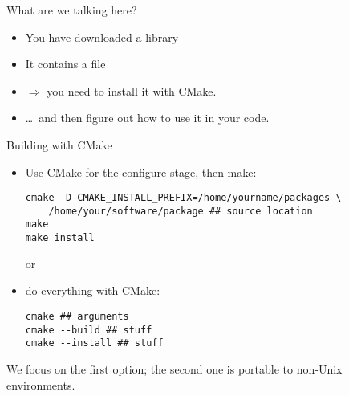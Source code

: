 
\lstset{language=bash}


\begin{numberedframe}{What are we talking here?}
  \begin{itemize}
  \item You have downloaded a library
  \item It contains a file 
  \item $\Rightarrow$ you need to install it with CMake.
  \item \ldots~and then figure out how to use it in your code.
  \end{itemize}
\end{numberedframe}

\begin{comment}
\begin{numberedframe}{Building software the old way}
  Using `GNU Autotools':
\begin{lstlisting}
./configure
make
make install
\end{lstlisting}
\end{numberedframe}

\begin{numberedframe}{User vs system packages}
  The \n{make install} often tries to copy
  to a system directory. If you're not the admin, do:
\begin{lstlisting}
./configure --prefix=/home/yourname/mypackages
\end{lstlisting}
with a location of your choice.
\end{numberedframe}
\end{comment}

\begin{numberedframe}{Building with CMake}
  \begin{itemize}
  \item Use CMake for the configure stage, then make:
\begin{lstlisting}
cmake -D CMAKE_INSTALL_PREFIX=/home/yourname/packages \
    /home/your/software/package ## source location
make
make install
\end{lstlisting}
or
  \item do everything with CMake:
\begin{lstlisting}
cmake ## arguments
cmake --build ## stuff
cmake --install ## stuff
\end{lstlisting}
  \end{itemize}
  We focus on the first option;
  the second one is portable to non-Unix environments.
\end{numberedframe}

